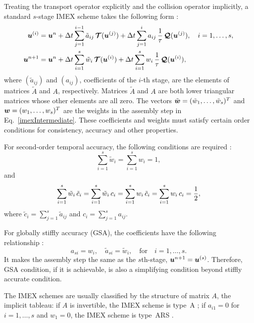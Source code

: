 Treating the transport operator explicitly and the collision operator implicitly, a standard $s$-stage IMEX scheme takes the following form \cite{pareschiRusso_2005}: 
\begin{align}
  \boldsymbol{u}^{(i)}
  &=\boldsymbol{u}^{n}
  +\Delta t\sum_{j=1}^{i-1}\tilde{a}_{ij}\,\boldsymbol{\mathcal{T}}(\boldsymbol{u}^{(j)})
  +\Delta t\sum_{j=1}^{i}a_{ij}\,\frac{1}{\tau}\,\boldsymbol{\mathcal{Q}}(\boldsymbol{u}^{(j)}),
  \quad i=1,\ldots,s, \label{imexStages} \\
  \boldsymbol{u}^{n+1}
  &=\boldsymbol{u}^{n}
  +\Delta t\sum_{i=1}^{s}\tilde{w}_{i}\,\boldsymbol{\mathcal{T}}(\boldsymbol{u}^{(i)})
  +\Delta t\sum_{i=1}^{s}w_{i}\,\frac{1}{\tau}\,\boldsymbol{\mathcal{Q}}(\boldsymbol{u}^{(i)}), \label{imexIntermediate} 
\end{align}
where $(\tilde{a}_{ij})$ and $(a_{ij})$, coefficients of the $i$-th stage, are the elements of matrices $\tilde{A}$ and $A$, respectively.
Matrices $\tilde{A}$ and $A$ are both lower triangular matrices whose other elements are all zero.
The vectors $\tilde{\boldsymbol{w}}=(\tilde{w}_{1},\ldots,\tilde{w}_{s})^{T}$ and $\boldsymbol{w}=(w_{1},\ldots,w_{s})^{T}$ are the weights in the assembly step in Eq.~\eqref{imexIntermediate}.
These coefficients and weights must satisfy certain order conditions for consistency, accuracy and other properties.
  
For second-order temporal accuracy, the following conditions are required \cite{hairer_1981}:
\begin{equation}
  \sum_{i=1}^{s}\tilde{w}_{i}=\sum_{i=1}^{s}w_{i}=1,
  \label{orderConditions1}
\end{equation}
and
\begin{equation}
  \sum_{i=1}^{s}\tilde{w}_{i}\,\tilde{c}_{i}
  =\sum_{i=1}^{s}\tilde{w}_{i}\,c_{i}
  =\sum_{i=1}^{s}w_{i}\,\tilde{c}_{i}
  =\sum_{i=1}^{s}w_{i}\,c_{i}=\frac{1}{2}, 
  \label{orderConditions2}
\end{equation}
where $\tilde{c}_{i} = \sum_{j=1}^{s}\tilde{a}_{ij}$ and $c_{i}=\sum_{j=1}^{s}a_{ij}$.

For globally stiffly accuracy (GSA), the coefficients have the following relationship \cite{dimarcoPareschi2013}:
\begin{equation}
a_{si}=w_{i}, \quad \tilde{a}_{si}=\tilde{w}_{i}, \quad \text{for} \quad i=1,\ldots,s.
\end{equation}
It makes the assembly step the same as the $s$th-stage, $\boldsymbol{u}^{n+1} = \boldsymbol{u}^{(s)}$.
Therefore, GSA condition, if it is achievable, is also a simplifying condition beyond stiffly accurate condition.

The IMEX schemes are usually classified by the structure of matrix $A$, the implicit tableau:
if $A$ is invertible, the IMEX scheme is type~A \cite{pareschiRusso_2005};
if $a_{i1} = 0$ for $i=1,\ldots,s$ and $w_{1} = 0$, the IMEX scheme is type~ARS \cite{ascher_etal_1997,pareschiRusso_2005}. 

